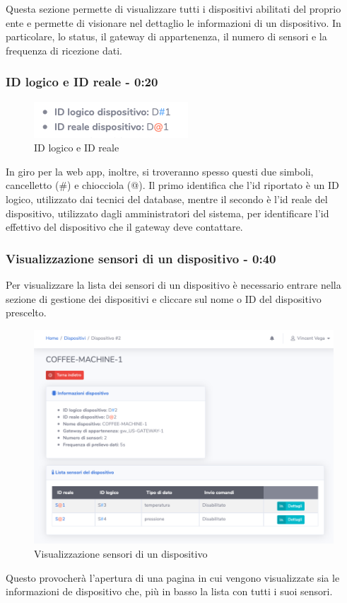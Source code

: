 		Questa sezione permette di visualizzare tutti i dispositivi abilitati del proprio ente e permette di visionare nel dettaglio le informazioni di un dispositivo.
		In particolare, lo status, il gateway di appartenenza, il numero di sensori e la frequenza di ricezione dati. 


	\subsubsection{ID logico e ID reale - 0:20}
		\begin{figure}[H]
		\centering
		\includegraphics[scale=0.700]{res/images/membro/IDLogicoIDReale.png}
		\caption{ID logico e ID reale}
		\end{figure}
		In giro per la web app, inoltre, si troveranno spesso questi due simboli, cancelletto (\#) e chiocciola (@). Il primo identifica che l'id riportato è un ID logico, utilizzato dai tecnici del database, mentre il secondo è l'id reale del dispositivo, utilizzato dagli amministratori del sistema, per identificare l'id effettivo del dispositivo che il gateway deve contattare.

	\subsubsection{Visualizzazione sensori di un dispositivo - 0:40}
		Per visualizzare la lista dei sensori di un dispositivo è necessario entrare nella sezione di gestione dei dispositivi e cliccare sul nome o ID del dispositivo prescelto.
		\begin{figure}[H]
		\centering
		\includegraphics[scale=0.450]{res/images/membro/visSensori.png}
		\caption{Visualizzazione sensori di un dispositivo}
		\end{figure}
		Questo provocherà l'apertura di una pagina in cui vengono visualizzate sia le informazioni de dispositivo che, più in basso la lista con tutti i suoi sensori.

